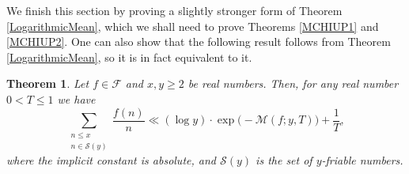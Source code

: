 \documentclass[12pt]{amsart}
\newtheorem{thm}{Theorem}[section]
\newtheorem{lem}[thm]{Lemma}
\theoremstyle{definition}
\numberwithin{equation}{section}
\newcommand{\mc}{\mathcal}
\begin{document}
We finish this section by proving a slightly stronger form of Theorem \ref{LogarithmicMean}, which we shall need to prove Theorems \ref{MCHIUP1} and \ref{MCHIUP2}. One can also show that the following result follows from Theorem \ref{LogarithmicMean}, so it is in fact equivalent to it. 
\begin{thm}\label{LogarithmicMean2}
Let $f\in \mathcal{F}$ and $x, y\geq 2$ be real numbers. Then, for any real number $0< T\leq 1$ we have
$$\sum_{\substack{n\leq x\\ n\in \mathcal{S}(y)}}\frac{f(n)}{n}\ll (\log y) \cdot \exp\big(-\mc{M}(f;y,T)\big)+\frac{1}{T},
$$
where the implicit constant is absolute, and $\mc{S}(y)$ is the set of $y$-friable numbers.
\end{thm}
\end{document}
